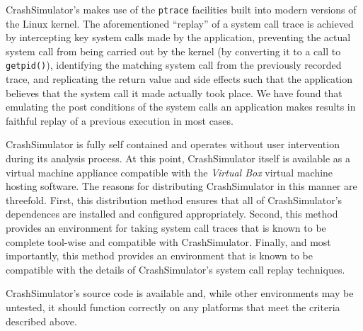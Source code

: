         
    CrashSimulator's makes use of the {\tt ptrace} facilities built into modern
    versions of the Linux kernel. The aforementioned ``replay'' of a system call
    trace is achieved by intercepting key system calls made by the application,
    preventing the actual system call from being carried out by the kernel (by
    converting it to a call to {\tt getpid()}), identifying the matching system
    call from the previously recorded trace, and replicating the return value
    and side effects such that the application believes that the system call it
    made actually took place. We have found that emulating the post conditions
    of the system calls an application makes results in faithful replay of a
    previous execution in most cases.

    CrashSimulator is fully self contained and operates without user
    intervention during its analysis process. At this point, CrashSimulator
    itself is available as a virtual machine appliance compatible with the
    \emph{Virtual Box} virtual machine hosting software.  The reasons for
    distributing CrashSimulator in this manner are threefold.  First, this
    distribution method ensures that all of CrashSimulator's dependences are
    installed and configured appropriately.  Second, this method provides an
    environment for taking system call traces that is known to be complete
    tool-wise and compatible with CrashSimulator.  Finally, and most importantly,
    this method provides an environment that is known to be compatible with the
    details of CrashSimulator's system call replay techniques.

    CrashSimulator's source code is available and, while other environments may
    be untested, it should function correctly on any platforms that meet the
    criteria described above.
